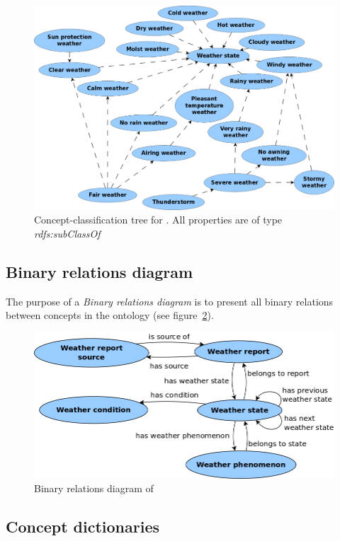 \begin{figure}
  \centering
  \includegraphics[width=\textwidth]{figures/diagrams/weather-state.png}
  \caption{Concept-classification tree for . All properties are of type \emph{rdfs:subClassOf}}
  \label{fig:tree_weather_state}
\end{figure}

\subsection{Binary relations diagram}
\label{subsec:binary_relations_diagram}

The purpose of a \emph{Binary relations diagram} is to present all binary relations between concepts in the ontology (see figure~\ref{fig:binary_relations}).

\begin{figure}
  \centering
  \includegraphics[width=.8\textwidth]{figures/diagrams/binary-relations.png}
  \caption{Binary relations diagram of \thinkhomeweather}
  \label{fig:binary_relations}
\end{figure}

\subsection{Concept dictionaries}
\label{subsec:concept_dictionaries}

